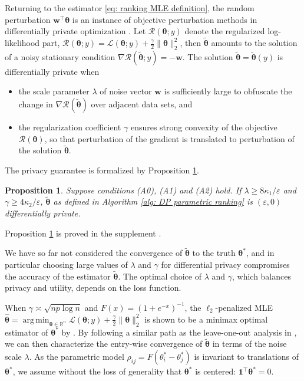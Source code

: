 \documentclass[letterpaper,12pt]{article}
\numberwithin{equation}{section}
\theoremstyle{plain}
\numberwithin{Theorem}{section}
\numberwithin{corollary}{section}
\newtheorem{proposition}{Proposition}
\numberwithin{proposition}{section}
\numberwithin{Lemma}{section}
{
	\theoremstyle{definition}
	\newtheorem{Definition}{Definition}
	\newtheorem{example}{Example}
	\numberwithin{example}{section}
	\newtheorem{fact}{Fact}
	\numberwithin{fact}{section}
	\newtheorem{remark}{Remark}
}
\newcommand{\1}{\mathbbm{1}}
\def\bth{{\boldsymbol{\theta}}}
\DeclareMathOperator*{\argmin}{arg\,min}
\def\R{{\mathbb R}}
\begin{document}
Returning to the estimator \eqref{eq: ranking MLE definition}, the random perturbation $\bm w^\top \bth$ is an instance of objective perturbation methods in differentially private optimization \cite{chaudhuri2011differentially, kifer2012private}. Let $\mathcal R(\bth; y)$ denote the regularized log-likelihood part, $\mathcal R(\bth; y) = \mathcal L(\bth; y) + \frac{\gamma}{2}\|\bth\|_2^2$, then $\widetilde \bth$ amounts to the solution of a noisy stationary condition $\nabla \mathcal R(\widetilde \bth; y) = -\bm w$. The solution $\widetilde \bth = \widetilde \bth(y)$ is differentially private when
\begin{itemize}
	\item the scale parameter $\lambda$ of noise vector $\bm w$ is sufficiently large to obfuscate the change in $\nabla \mathcal R(\widetilde \bth)$ over adjacent data sets, and 
	\item the regularization coefficient $\gamma$ ensures strong convexity of the objective $\mathcal R(\bth)$, so that perturbation of the gradient is translated to perturbation of the solution $\widetilde \bth$.
\end{itemize}
The privacy guarantee is formalized by Proposition \ref{prop: ranking MLE privacy}.
\begin{proposition}\label{prop: ranking MLE privacy}
	Suppose conditions (A0), (A1) and (A2) hold. If $\lambda \geq 8\kappa_1/\varepsilon$ and $\gamma \geq 4\kappa_2/\varepsilon$, $\widetilde\bth$ as defined in Algorithm \ref{alg: DP parametric ranking} is $(\varepsilon, 0)$ differentially private.
\end{proposition}
Proposition \ref{prop: ranking MLE privacy} is proved in the supplement \cite{cai2023optimal}.

We have so far not considered the convergence of $\widetilde \bth$ to the truth $\bth^*$, and in particular choosing large values of $\lambda$ and $\gamma$ for differential privacy compromises the accuracy of the estimator $\widetilde \bth$. 
The optimal choice of $\lambda$ and $\gamma$, which balances privacy and utility, depends on the loss function. 

When $\gamma \asymp \sqrt{np\log n}$ and $F(x) = (1 + e^{-x})^{-1}$, the $\ell_2$-penalized MLE $\hat\bth = \argmin_{\bth \in \R^n} \mathcal L(\bth; y) + \frac{\gamma}{2}\|\bth\|_2^2$ is shown to be a minimax optimal estimator of $\bth^*$ by \cite{chen2019spectral}. By following a similar path as the leave-one-out analysis in \cite{chen2019spectral}, we can then characterize the entry-wise convergence of $\widetilde \bth$ in terms of the noise scale $\lambda$. As the parametric model $\rho_{ij} = F(\theta^*_i - \theta^*_j)$ is invariant to translations of $\bth^*$, we assume without the loss of generality that $\bth^*$ is centered: $\bm 1^\top \bth^* = 0$.
\end{document}

